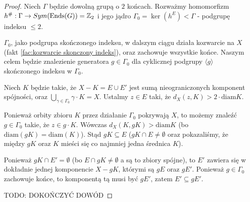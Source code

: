 \begin{proof}
  Niech $\Gamma$ będzie dowolną grupą o $2$ końcach. Rozważmy homomorfizm $h^{\#}:\Gamma\to Sym(\operatorname{Ends}(G))=\mathbb{Z}_2$ i jego jądro $\Gamma_0=\ker(h^E)<\Gamma$ - podgrupę indeksu $\leq 2$.

  $\Gamma_0$, jako podgrupa skończonego indeksu, w dalszym ciągu działa kozwarcie na $X$ (fakt \ref{fac:kozwarcie skonczony indeks}), oraz zachowuje wszystkie końce. Naszym celem będzie znalezienie generatora $g\in \Gamma_0$ dla cyklicznej podgrupy $\langle g\rangle$ skończonego indeksu w $\Gamma_0$.

  Niech $K$ będzie takie, że $X-K=E\cup E'$ jest sumą nieograniczonych komponent spójności, oraz $\bigcup_{\gamma\in\Gamma_0}\gamma\cdot K=X$. Ustalmy $z\in E$ taki, że $d_X(z, K)>2\cdot \text{diam}K$.

  Ponieważ orbity zbioru $K$ przez działanie $\Gamma_0$ pokrywają $X$, to możemy znaleźć $g\in\Gamma_0$ takie, że $z\in g\cdot K$. Wówczas $d_X(K, gK)>\text{diam}K$ (bo $\text{diam}(gK)=\text{diam}(K)$). Stąd $gK\subseteq E$ ($gK\cap E\neq\emptyset$ oraz pokazaliśmy, że między $gK$ oraz $K$ mieści się co najmniej jedna średnica $K$).

  Ponieważ $gK\cap E'=\emptyset$ (bo $E\cap gK\neq\emptyset$ a są to zbiory spójne), to $E'$ zawiera się w dokładnie jednej komponencie $X-gK$, którymi są $gE$ oraz $gE'$. Ponieważ $g\in \Gamma_0$ zachowuje końce, to komponentą tą musi być $gE'$, zatem $E'\subseteq gE'$.

  {\large\color{red}TODO: DOKOŃCZYĆ DOWÓD}
\end{proof}







